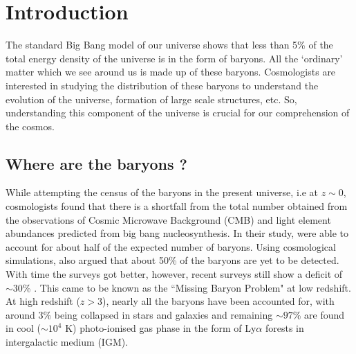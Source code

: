 \chapter{Introduction}  \label{chap:intro}

The standard Big Bang model of our universe shows that less than 5\% \citep{planck_collaboration_planck_2020} of the total energy density of the universe is in the form of baryons. All the `ordinary' matter which we see around us is made up of these baryons. Cosmologists are interested in studying the distribution of these baryons to understand the evolution of the universe, formation of large scale structures, etc. So, understanding this component of the universe is crucial for our comprehension of the cosmos.

\section{Where are the baryons ?}

While attempting the census of the baryons in the present universe, i.e at $z \sim 0$, cosmologists found that there is a shortfall from the total number obtained from the observations of Cosmic Microwave Background (CMB) and light element abundances predicted from big bang nucleosynthesis. In their study, \citet{Fukugita-1998} were able to account for about half of the expected number of baryons. Using cosmological simulations, \citet{cen-ostriker-1999} also argued that about 50\% of the baryons are yet to be detected. With time the surveys got better, however, recent surveys still show a deficit of $\sim 30$\% \citep{Shull}. This came to be known as the ``Missing Baryon Problem" at low redshift. At high redshift ($z>3$), nearly all the baryons have been accounted for, with around 3\% being collapsed in stars and galaxies and remaining $\sim97$\% are found in cool ($\sim10^4$ K) photo-ionised gas phase in the form of Ly$\alpha$ forests in intergalactic medium (IGM). 


